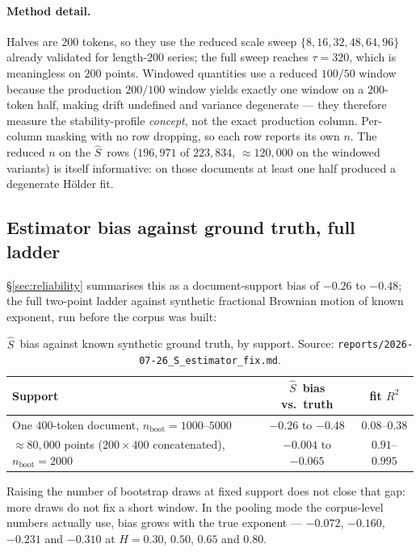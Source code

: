 \documentclass{article}
\newcommand{\Sest}{\ensuremath{\widehat{S}}}
\newcommand{\Htrue}{\ensuremath{H}}
\begin{document}
\paragraph{Method detail.} Halves are $200$ tokens, so they use the reduced
scale sweep $\{8,16,32,48,64,96\}$ already validated for length-$200$ series;
the full sweep reaches $\tau=320$, which is meaningless on $200$ points.
Windowed quantities use a reduced $100/50$ window because the production
$200/100$ window yields exactly one window on a $200$-token half, making drift
undefined and variance degenerate --- they therefore measure the
stability-profile \emph{concept}, not the exact production column. Per-column
masking with no row dropping, so each row reports its own $n$. The reduced $n$
on the \Sest\ rows ($196{,}971$ of $223{,}834$, $\approx120{,}000$ on the windowed
variants) is itself informative: on those documents at least one half produced
a degenerate H\"older fit.

\subsection{Estimator bias against ground truth, full ladder}
\label{app:biasladder}

\S\ref{sec:reliability} summarises this as a document-support bias of $-0.26$ to
$-0.48$; the full two-point ladder against synthetic fractional Brownian motion
of known exponent, run before the corpus was built:

\begin{table}[h]
\centering
\footnotesize
\caption{\Sest\ bias against known synthetic ground truth, by support.
Source: \texttt{reports/2026-07-26\_S\_estimator\_fix.md}.}
\label{tab:biasladder}
\begin{tabular}{lcc}
\toprule
Support & \Sest\ bias vs.\ truth & fit $R^2$ \\
\midrule
One $400$-token document, $n_{\text{boot}}\!=\!1000$--$5000$ & $-0.26$ to $-0.48$ & $0.08$--$0.38$ \\
$\approx\!80{,}000$ points ($200\times400$ concatenated), $n_{\text{boot}}\!=\!2000$ & $-0.004$ to $-0.065$ & $0.91$--$0.995$ \\
\bottomrule
\end{tabular}
\end{table}

Raising the number of bootstrap draws at fixed support does not close that gap:
more draws do not fix a short window. In the pooling mode the corpus-level
numbers actually use, bias grows with the true exponent --- $-0.072$, $-0.160$,
$-0.231$ and $-0.310$ at $\Htrue=0.30$, $0.50$, $0.65$ and $0.80$.
\end{document}
